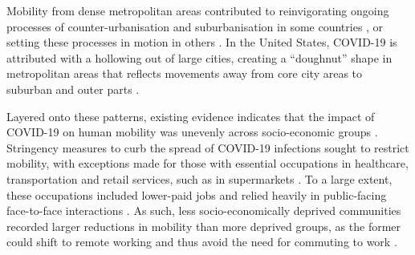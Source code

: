 \documentclass[fleqn,10pt]{wlscirep}
\begin{document}
Mobility from dense metropolitan areas contributed to reinvigorating ongoing processes of counter-urbanisation and suburbanisation in some countries \cite{rowe2023}, or setting these processes in motion in others \cite{halfacree2024counterurbanisation}. In the United States, COVID-19 is attributed with a hollowing out of large cities, creating a ``doughnut'' shape in metropolitan areas that reflects movements away from core city areas to suburban and outer parts \cite{ramani2024working}. %

Layered onto these patterns, existing evidence indicates that the impact of COVID-19 on human mobility was unevenly across socio-economic groups \cite{duenas2021changes, do2021association, elejalde2024social}. Stringency measures to curb the spread of COVID-19 infections sought to restrict mobility, with exceptions made for those with essential occupations in healthcare, transportation and retail services, such as in supermarkets \cite{florida2021}. To a large extent, these occupations included lower-paid jobs and relied heavily in public-facing face-to-face interactions \cite{florida2021}. As such, less socio-economically deprived communities recorded larger reductions in mobility than more deprived groups, as the former could shift to remote working and thus avoid the need for commuting to work \cite{nathan2020}. %
\end{document}
